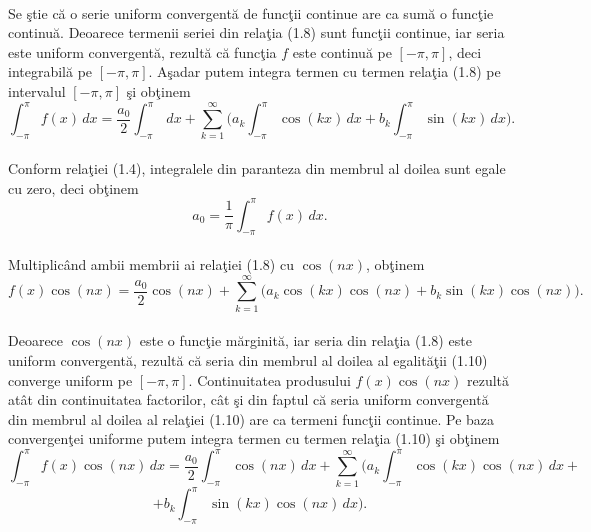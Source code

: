 \documentclass[a4paper,openany,12pt]{report}
\begin{document}
\paragraph*{}Se \c stie c\u a o serie uniform convergent\u a de func\c tii continue are ca sum\u a o func\c tie continu\u a. Deoarece termenii seriei din rela\c tia (1.8) sunt func\c tii continue, iar seria este uniform convergent\u a, rezult\u a c\u a func\c tia $f$ este continu\u a pe $[-\pi, \pi]$, deci integrabil\u a pe $[-\pi, \pi]$. A\c sadar putem integra termen cu termen rela\c tia (1.8) pe intervalul $[-\pi, \pi]$ \c si ob\c tinem
\begin{equation*}
\int_{-\pi}^\pi f(x)\,dx =\frac{a_0}{2}\int_{-\pi}^\pi \,dx+ \sum_{k=1}^\infty \Bigg(a_k\int_{-\pi}^\pi \cos(kx)\,dx+ b_k\int_{-\pi}^\pi \sin(kx)\,dx\Bigg).
\end{equation*}
\paragraph*{}Conform rela\c tiei (1.4), integralele din paranteza din membrul al doilea sunt egale cu zero, deci ob\c tinem
\begin{equation}
a_0 = \frac{1}{\pi}\int_{-\pi}^\pi f(x)\,dx.
\end{equation}
\paragraph*{}Multiplic\^ and ambii membrii ai rela\c tiei (1.8) cu $\cos(nx)$, ob\c tinem
\begin{equation}
f(x)\cos(nx) = \frac{a_0}{2}\cos(nx) + \sum_{k=1}^\infty \Big(a_k\cos(kx)\cos(nx) + b_k\sin(kx)\cos(nx)\Big).
\end{equation}
\paragraph*{}Deoarece $\cos(nx)$ este o func\c tie m\u arginit\u a, iar seria din rela\c tia (1.8) este uniform convergent\u a, rezult\u a c\u a seria din membrul al doilea al egalit\u a\c tii (1.10) converge uniform pe $[-\pi, \pi]$. Continuitatea produsului $f(x)\cos(nx)$ rezult\u a at\^ at din continuitatea factorilor, c\^ at \c si din faptul c\u a seria uniform convergent\u a din membrul al doilea al rela\c tiei (1.10) are ca termeni func\c tii continue. Pe baza convergen\c tei uniforme putem integra termen cu termen rela\c tia (1.10) \c si ob\c tinem
\begin{equation*}
\int_{-\pi}^\pi f(x)\cos(nx)\,dx = \frac{a_0}{2} \int_{-\pi}^\pi \cos(nx)\,dx + \sum_{k=1}^\infty \Bigg(a_k\int_{-\pi}^\pi \cos(kx)\cos(nx)\,dx +
\end{equation*}
\begin{equation}
 + b_k\int_{-\pi}^\pi \sin(kx)\cos(nx)\,dx\Bigg).
\end{equation}
\end{document}
